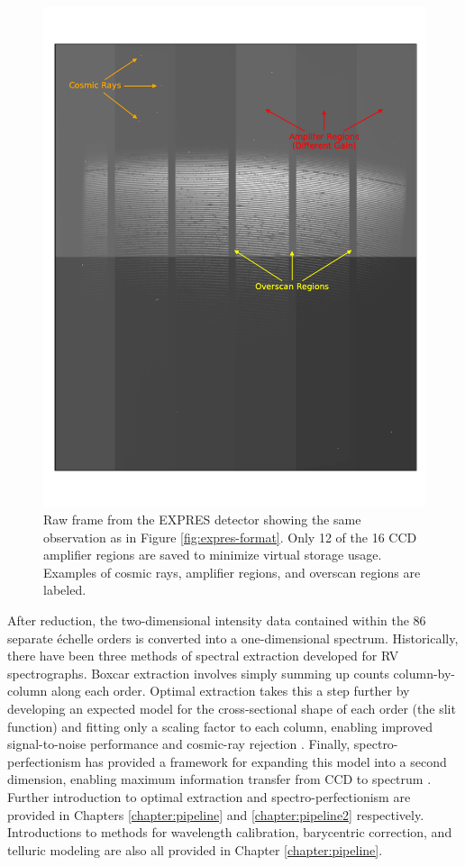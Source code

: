 \begin{figure}
    \centering
    \includegraphics[width=\textwidth]{figures-1/expres-raw.pdf}
    \caption[EXPRES raw CCD frame]{Raw frame from the EXPRES detector showing the same observation as in Figure \ref{fig:expres-format}. Only 12 of the 16 CCD amplifier regions are saved to minimize virtual storage usage. Examples of cosmic rays, amplifier regions, and overscan regions are labeled.}
    \label{fig:expres-raw}
\end{figure}

After reduction, the two-dimensional intensity data contained within the 86 separate \'echelle orders is converted into a one-dimensional spectrum. Historically, there have been three methods of spectral extraction developed for RV spectrographs. Boxcar extraction involves simply summing up counts column-by-column along each order. Optimal extraction takes this a step further by developing an expected model for the cross-sectional shape of each order (the slit function) and fitting only a scaling factor to each column, enabling improved signal-to-noise performance and cosmic-ray rejection \citep{horne_optimal_1986}. Finally, spectro-perfectionism has provided a framework for expanding this model into a second dimension, enabling maximum information transfer from CCD to spectrum \citep{bolton_spectro-perfectionism_2009}. Further introduction to optimal extraction and spectro-perfectionism are provided in Chapters \ref{chapter:pipeline} and \ref{chapter:pipeline2} respectively. Introductions to methods for wavelength calibration, barycentric correction, and telluric modeling are also all provided in Chapter \ref{chapter:pipeline}.

